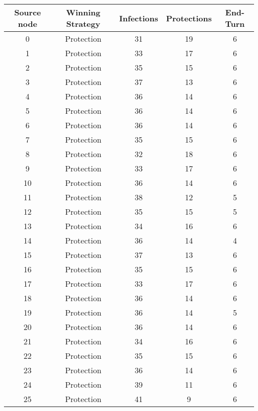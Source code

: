 \documentclass[results.tex]{subfiles}
\begin{document}
\begin{center}
  \begin{tabular}{| c || c | c | c | c |}
    \hline
    {\bfseries Source node} & {\bfseries Winning Strategy} & {\bfseries Infections} & {\bfseries Protections} & {\bfseries End-Turn} \\  %
    \hline\hline
    0 & Protection & 31 & 19 & 6 \\ 
    \hline
    1 & Protection & 33 & 17 & 6 \\ 
    \hline
    2 & Protection & 35 & 15 & 6 \\ 
    \hline
    3 & Protection & 37 & 13 & 6 \\ 
    \hline
    4 & Protection & 36 & 14 & 6 \\ 
    \hline
    5 & Protection & 36 & 14 & 6 \\ 
    \hline
    6 & Protection & 36 & 14 & 6 \\ 
    \hline
    7 & Protection & 35 & 15 & 6 \\ 
    \hline
    8 & Protection & 32 & 18 & 6 \\ 
    \hline
    9 & Protection & 33 & 17 & 6 \\ 
    \hline
    10 & Protection & 36 & 14 & 6 \\ 
    \hline
    11 & Protection & 38 & 12 & 5 \\ 
    \hline
    12 & Protection & 35 & 15 & 5 \\ 
    \hline
    13 & Protection & 34 & 16 & 6 \\ 
    \hline
    14 & Protection & 36 & 14 & 4 \\ 
    \hline
    15 & Protection & 37 & 13 & 6 \\ 
    \hline
    16 & Protection & 35 & 15 & 6 \\ 
    \hline
    17 & Protection & 33 & 17 & 6 \\ 
    \hline
    18 & Protection & 36 & 14 & 6 \\ 
    \hline
    19 & Protection & 36 & 14 & 5 \\ 
    \hline
    20 & Protection & 36 & 14 & 6 \\ 
    \hline
    21 & Protection & 34 & 16 & 6 \\ 
    \hline
    22 & Protection & 35 & 15 & 6 \\ 
    \hline
    23 & Protection & 36 & 14 & 6 \\ 
    \hline
    24 & Protection & 39 & 11 & 6 \\ 
    \hline
    25 & Protection & 41 & 9 & 6 \\ 

\end{tabular}
\end{center}
\end{document}
